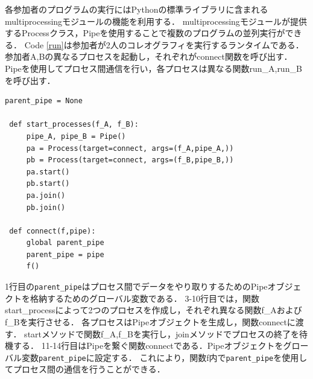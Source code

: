 \documentclass{thesis}
\begin{document}
各参加者のプログラムの実行にはPythonの標準ライブラリに含まれる\textsf{multiprocessing}モジュールの機能を利用する．
\textsf{multiprocessing}モジュールが提供するProcessクラス，Pipeを使用することで複数のプログラムの並列実行ができる．
Code \ref{run}は参加者が2人のコレオグラフィを実行するランタイムである．
参加者A,Bの異なるプロセスを起動し，それぞれが\textsf{connect}関数を呼び出す．
Pipeを使用してプロセス間通信を行い，各プロセスは異なる関数\textsf{run\_A},\textsf{run\_B}を呼び出す．
\begin{lstlisting}[caption = runtime , label = run]
 parent_pipe = None

 def start_processes(f_A, f_B):
     pipe_A, pipe_B = Pipe()
     pa = Process(target=connect, args=(f_A,pipe_A,))
     pb = Process(target=connect, args=(f_B,pipe_B,))
     pa.start()
     pb.start()
     pa.join() 
     pb.join()

 def connect(f,pipe):
     global parent_pipe
     parent_pipe = pipe
     f()
\end{lstlisting}
1行目の\texttt{parent\_pipe}はプロセス間でデータをやり取りするためのPipeオブジェクトを格納するためのグローバル変数である．
3-10行目では，関数\textsf{start\_process}によって2つのプロセスを作成し，それぞれ異なる関数\textsf{f\_A}および\textsf{f\_B}を実行させる．
各プロセスはPipeオブジェクトを生成し，関数\textsf{connect}に渡す．
\textsf{start}メソッドで関数\textsf{f\_A},\textsf{f\_B}を実行し，\textsf{join}メソッドでプロセスの終了を待機する．
11-14行目はPipeを繋ぐ関数\textsf{connect}である．Pipeオブジェクトをグローバル変数\texttt{parent\_pipe}に設定する．
これにより，関数\textsf{f}内で\texttt{parent\_pipe}を使用してプロセス間の通信を行うことができる．



\end{document}
